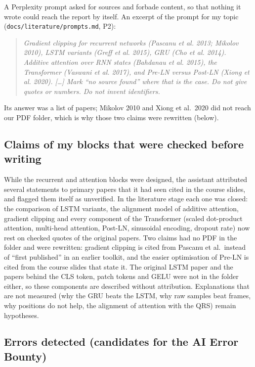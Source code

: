 A Perplexity prompt asked for sources and forbade content, so that nothing it wrote could reach the report
by itself. An excerpt of the prompt for my topic (\texttt{docs/literature/prompts.md}, P2):
\begin{quote}\small\itshape
Gradient clipping for recurrent networks (Pascanu et al. 2013; Mikolov 2010), LSTM variants (Greff et al.
2015), GRU (Cho et al. 2014). Additive attention over RNN states (Bahdanau et al. 2015), the Transformer
(Vaswani et al. 2017), and Pre-LN versus Post-LN (Xiong et al. 2020). [\ldots] Mark ``no source found''
where that is the case. Do not give quotes or numbers. Do not invent identifiers.
\end{quote}
Its answer was a list of papers; Mikolov 2010 and Xiong et al.\ 2020 did not reach our PDF folder, which is why
those two claims were rewritten (below).

\subsection*{Claims of my blocks that were checked before writing}

While the recurrent and attention blocks were designed, the assistant attributed several statements to
primary papers that it had seen cited in the course slides, and flagged them itself as unverified. In the
literature stage each one was closed: the comparison of LSTM variants, the alignment model of additive
attention, gradient clipping and every component of the Transformer (scaled dot-product attention,
multi-head attention, Post-LN, sinusoidal encoding, dropout rate) now rest on checked quotes of the
original papers. Two claims had no PDF in the folder and were rewritten: gradient clipping is cited from
Pascanu et al.\ instead of ``first published'' in an earlier toolkit, and the easier optimisation of Pre-LN
is cited from the course slides that state it. The original LSTM paper and the papers behind the CLS token,
patch tokens and GELU were not in the folder either, so these components are described without
attribution. Explanations that are not measured (why the GRU beats the LSTM, why raw samples beat frames,
why positions do not help, the alignment of attention with the QRS) remain hypotheses.

\subsection*{Errors detected (candidates for the AI Error Bounty)}

